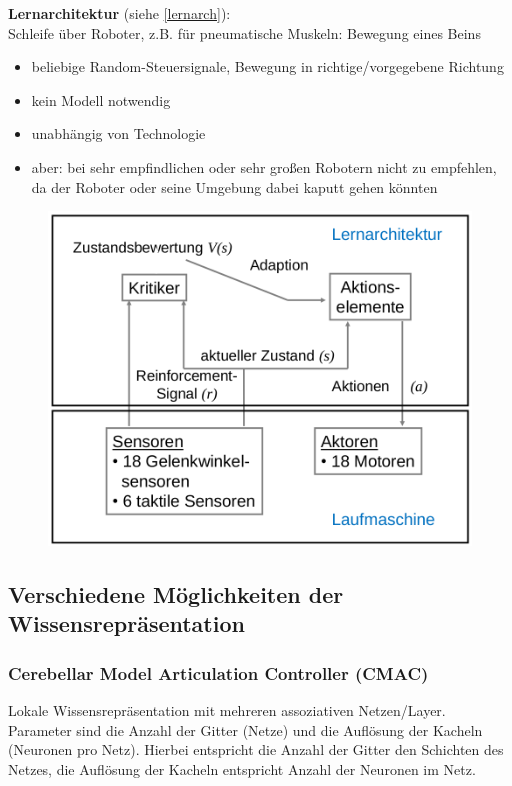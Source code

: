 \textbf{Lernarchitektur} (siehe \autoref{lernarch}):\\
Schleife über Roboter, z.B. für pneumatische Muskeln: Bewegung eines Beins
\begin{itemize}
\item beliebige Random-Steuersignale, Bewegung in richtige/vorgegebene Richtung
\item kein Modell notwendig
\item unabhängig von Technologie
\item aber: bei sehr empfindlichen oder sehr großen Robotern nicht zu empfehlen, da der Roboter oder seine Umgebung dabei kaputt gehen könnten
\end{itemize}
\begin{figure}[h!]
	\centering
	\includegraphics[width=.7\textwidth]{figures/lernarchitektur.png}
	\caption{}
	\label{lernarch}
\end{figure}

\subsection{Verschiedene Möglichkeiten der Wissensrepräsentation}

\subsubsection{Cerebellar Model Articulation Controller (CMAC)}
Lokale Wissensrepräsentation mit mehreren assoziativen Netzen/Layer. Parameter sind die Anzahl der Gitter (Netze) und die Auflösung der Kacheln (Neuronen pro Netz).
Hierbei entspricht die Anzahl der Gitter den Schichten des Netzes, die Auflösung der Kacheln entspricht Anzahl der Neuronen im Netz.
